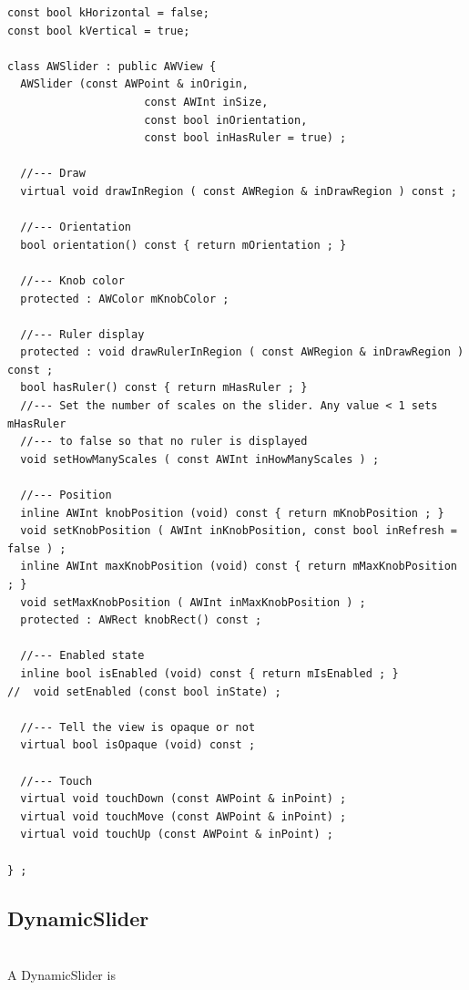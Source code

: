 \documentclass[a4paper,11pt]{extarticle}
\begin{document}
\begin{lstlisting}[language=Arduinonl]
const bool kHorizontal = false;
const bool kVertical = true;

class AWSlider : public AWView {
  AWSlider (const AWPoint & inOrigin,
                     const AWInt inSize,
                     const bool inOrientation,
                     const bool inHasRuler = true) ;

  //--- Draw
  virtual void drawInRegion ( const AWRegion & inDrawRegion ) const ;
   
  //--- Orientation
  bool orientation() const { return mOrientation ; }
  
  //--- Knob color
  protected : AWColor mKnobColor ;
  
  //--- Ruler display
  protected : void drawRulerInRegion ( const AWRegion & inDrawRegion ) const ;
  bool hasRuler() const { return mHasRuler ; }
  //--- Set the number of scales on the slider. Any value < 1 sets mHasRuler
  //--- to false so that no ruler is displayed
  void setHowManyScales ( const AWInt inHowManyScales ) ;
  
  //--- Position
  inline AWInt knobPosition (void) const { return mKnobPosition ; }
  void setKnobPosition ( AWInt inKnobPosition, const bool inRefresh = false ) ;
  inline AWInt maxKnobPosition (void) const { return mMaxKnobPosition ; }
  void setMaxKnobPosition ( AWInt inMaxKnobPosition ) ;
  protected : AWRect knobRect() const ;
  
  //--- Enabled state
  inline bool isEnabled (void) const { return mIsEnabled ; }
//  void setEnabled (const bool inState) ;
  
  //--- Tell the view is opaque or not
  virtual bool isOpaque (void) const ;
  
  //--- Touch
  virtual void touchDown (const AWPoint & inPoint) ;
  virtual void touchMove (const AWPoint & inPoint) ;
  virtual void touchUp (const AWPoint & inPoint) ;
  
} ;
\end{lstlisting}


\newpage
\subsection{DynamicSlider}

~\\ A DynamicSlider is 
~\\
~\\
\end{document}
